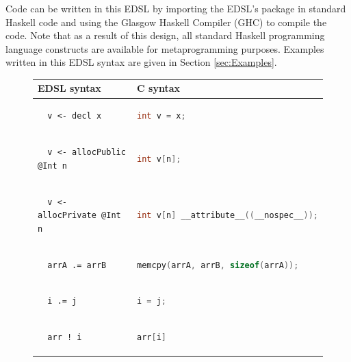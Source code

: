 \documentclass[10pt, conference]{IEEEtran}
\begin{document}
Code can be written in this EDSL by importing the EDSL's package in standard
Haskell code and using the Glasgow Haskell Compiler (GHC) to compile the code.
Note that as a result of this design, all standard Haskell programming language
constructs are available for metaprogramming purposes.  Examples written in this
EDSL syntax are given in Section \ref{sec:Examples}.

\begin{figure}
\begin{tabular}{|l|l|}
  \hline
  EDSL syntax & C syntax \\
  \hline
  \begin{lstlisting}
  v <- decl x
  \end{lstlisting}
  & \begin{lstlisting}[language=C]
  int v = x;
  \end{lstlisting}\\

  \hline
  \begin{lstlisting}
  v <- allocPublic @Int n
  \end{lstlisting}
  & \begin{lstlisting}[language=C]
  int v[n];
  \end{lstlisting}\\

  \hline
  \begin{lstlisting}
  v <- allocPrivate @Int n
  \end{lstlisting}
  & \begin{lstlisting}[language=C]
  int v[n] __attribute__((__nospec__));
  \end{lstlisting}\\

  \hline
  \begin{lstlisting}
  arrA .= arrB
  \end{lstlisting}
  & \begin{lstlisting}[language=C]
  memcpy(arrA, arrB, sizeof(arrA));
  \end{lstlisting}\\

  \hline
  \begin{lstlisting}
  i .= j
  \end{lstlisting}
  & \begin{lstlisting}[language=C]
  i = j;
  \end{lstlisting}\\

  \hline
  \begin{lstlisting}
  arr ! i
  \end{lstlisting}
  & \begin{lstlisting}[language=C]
  arr[i]
  \end{lstlisting}\\


\end{tabular}
\end{figure}
\end{document}

